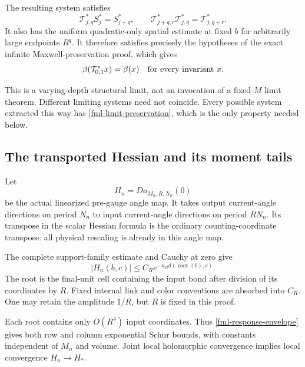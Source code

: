 The resulting system satisfies
\begin{equation}
 \mathcal T_{j,q}^*S_j^*=S_{j+q}^*,\qquad
 \mathcal T_{j+q,r}^*\mathcal T_{j,q}^*
                         =\mathcal T_{j,q+r}^*.
 \label{fml-limit-semigroup}
\end{equation}
It also has the uniform quadratic-only spatial estimate
at fixed \(b\) for arbitrarily large endpoints \(R^q\).
It therefore satisfies precisely the hypotheses of
the exact infinite Maxwell-preservation proof, which gives
\begin{equation}
                   \beta(\mathcal T_{0,1}^*x)=\beta(x)
                   \quad\hbox{for every invariant }x.
 \label{fml-limit-preservation}
\end{equation}

This is a varying-depth structural limit, not an invocation
of a fixed-\(M\) limit theorem. Different limiting systems
need not coincide. Every possible system extracted this
way has \eqref{fml-limit-preservation}, which is the only
property needed below.

\subsection{The transported Hessian and its moment tails}
\label{fml-Hessian-section}

Let
\begin{equation}
                       H_n=Da_{M_n,R,N_n}(0)
 \label{fml-linear-response}
\end{equation}
be the actual linearized pre-gauge angle map. It takes
output current-angle directions on period \(N_n\) to
input current-angle directions on period \(RN_n\).
Its transpose in the scalar Hessian formula is the
ordinary counting-coordinate transpose: all physical
rescaling is already in this angle map.

The complete support-family estimate and Cauchy at zero
give
\begin{equation}
 |H_n(b,c)|
       \le C_R e^{-\kappa_R d(\operatorname{root}(b),c)}.
 \label{fml-response-envelope}
\end{equation}
The root is the final-unit cell containing the input
bond after division of its coordinates by \(R\).
Fixed internal link and color conventions are absorbed
into \(C_R\). One may retain the amplitude \(1/R\), but
\(R\) is fixed in this proof.

Each root contains only \(O(R^4)\) input coordinates.
Thus \eqref{fml-response-envelope} gives both row and
column exponential Schur bounds, with constants independent
of \(M_n\) and volume. Joint local holomorphic convergence
implies local convergence \(H_n\to H_*\).

